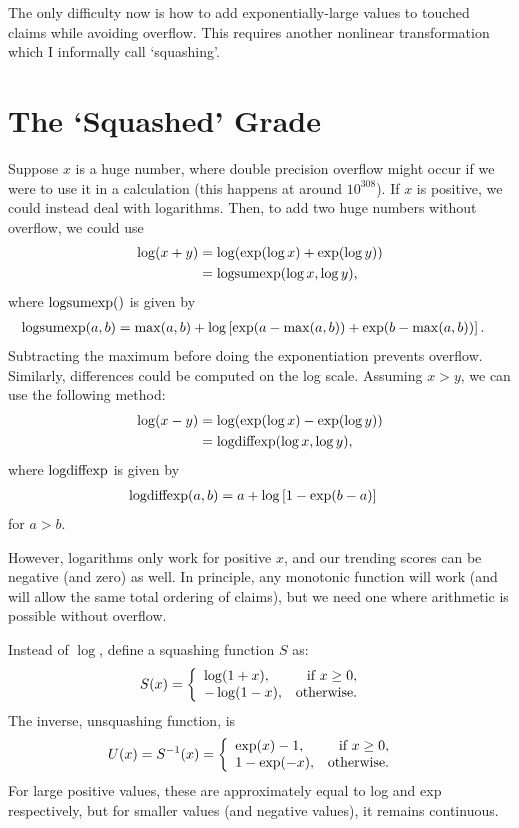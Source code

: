\documentclass[a4paper, 12pt]{article}
\newcommand{\logsumexp}{\textnormal{logsumexp}}
\newcommand{\logdiffexp}{\textnormal{logdiffexp}}
\begin{document}
The only difficulty now is how to add exponentially-large values to touched
claims while avoiding overflow. This requires another nonlinear transformation
which I informally call `squashing'.

\section{The `Squashed' Grade}
Suppose $x$ is a huge number, where double precision overflow might occur if
we were to use it in a calculation (this happens at around $10^{308}$).
If $x$ is positive, we could instead deal with logarithms. Then, to add
two huge numbers without overflow, we could use
\begin{align}
\log(x + y)  &= \log(\exp(\log x) + \exp(\log y)) \\
             &= \logsumexp(\log x, \log y),
\end{align}
where $\logsumexp()$ is given by
\begin{align}
\logsumexp(a, b) &= \max(a, b)
        + \log\left[\exp(a - \max(a, b)) + \exp(b - \max(a, b))\right].
\end{align}
Subtracting the maximum before doing the exponentiation prevents overflow.
Similarly, differences could be computed on the log scale. Assuming $x>y$,
we can use the following method:
\begin{align}
\log(x - y)  &= \log(\exp(\log x) - \exp(\log y)) \\
             &= \logdiffexp(\log x, \log y),
\end{align}
where $\logdiffexp$ is given by
\begin{align}
\logdiffexp(a, b) &= a
        + \log\left[1 - \exp(b-a)\right]
\end{align}
for $a > b$.

However,
logarithms only work for positive $x$, and our trending scores can be
negative (and zero) as well. In principle, any monotonic function will work
(and will allow the same total ordering of claims),
but we need one where arithmetic is possible without overflow.

Instead of $\log$, define a squashing function $S$ as:
\begin{align}
S(x) &=
    \left\{
        \begin{array}{lr}
            \log (1 + x), & \textnormal{if } x \geq 0, \\
            -\log(1 - x), & \textnormal{otherwise}.
        \end{array}
    \right.
\end{align}
The inverse, unsquashing function, is
\begin{align}
U(x) = S^{-1}(x) &=
    \left\{
        \begin{array}{lr}
            \exp(x) - 1,  & \textnormal{if } x \geq 0, \\
            1 - \exp(-x), & \textnormal{otherwise}.
        \end{array}
    \right.
\end{align}
For large positive values, these are approximately equal to log and exp
respectively, but for smaller values (and negative values), it remains
continuous.
\end{document}
